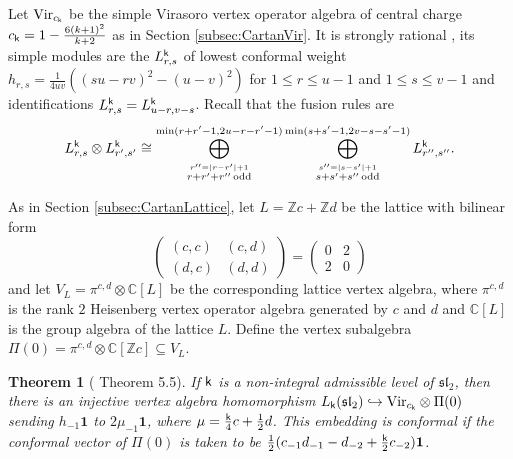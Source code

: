 \documentclass[a4paper, reqno]{amsart}
\newtheorem{theorem}{Theorem}[section]
\theoremstyle{introTheorems}
\def\CC{\mathbb{C}}
\def\ZZ{\mathbb{Z}}
\renewcommand\sl{\mathfrak{sl}}
\newcommand\Vir{\textup{Vir}}
\newcommand\vac{\mathbf{1}}
\renewcommand{\1}{\mathbbold{1}}
\begin{document}
Let $\Vir_{c_\k}$ be the simple Virasoro vertex operator algebra of central charge $c_{\mathsf{k}} =1 - \frac{6(k+1)^2}{k+2}$ 
as in Section \ref{subsec:CartanVir}. It is strongly rational \cite{W}, its simple modules are the $L^{\mathsf{k}}_{r,s}$ of lowest conformal weight $h_{r,s}=\frac{1}{4uv}((su-rv)^2-(u-v)^2)$ for $1\leq r \leq u-1$ and $1\leq s \leq v-1$ and identifications $L^{\mathsf{k}}_{r,s} = L^{\mathsf{k}}_{u-r,v-s}$. Recall that the fusion rules are
\begin{equation}\label{eqn:Vir-fus-rules}
    L^{\mathsf{k}}_{r,s} \otimes L^{\mathsf{k}}_{r',s'} \cong  \bigoplus_{\stackrel{r'' = \vert r-r'\vert+1}{r+r'+r''\,\text{odd}}}^{\min(r+r'-1,2u-r-r'-1)}\bigoplus_{\stackrel{s'' = \vert s-s'\vert+1}{s+s'+s''\,\text{odd}}}^{\min(s+s'-1,2v-s-s'-1)} L^{\mathsf{k}}_{r'',s''}.
\end{equation}

\bigskip
As in Section \ref{subsec:CartanLattice}, 
let $L = \ZZ c + \ZZ d$ be the lattice with bilinear form
$$\begin{pmatrix} (c,c) & (c,d) \\ (d,c) & (d,d)\end{pmatrix}=\begin{pmatrix}0 & 2 \\2 & 0\end{pmatrix}$$
and let $V_L=\pi^{c,d}\otimes \CC[L]$ be the corresponding lattice vertex algebra, where $\pi^{c,d}$ is the rank $2$ Heisenberg vertex operator algebra generated by $c$ and $d$ and $\CC[L]$ is the group algebra of the lattice $L$. Define the vertex subalgebra $\Pi(0) = \pi^{c,d} \otimes \CC[\ZZ c] \subseteq V_L$.
\begin{theorem}[\cite{A} Theorem 5.5]\label{thm: conformal embedding}
    If $\mathsf{k}$ is a non-integral admissible level of $\sl_2$, then there is an injective vertex algebra homomorphism $L_\k(\sl_2) \hookrightarrow \Vir_{c_\k} \otimes \Pi(0)$ sending $h_{-1}\vac$ to $2\mu_{-1}\vac$, where $\mu=\frac{\mathsf{k}}{4}c+\frac{1}{2}d$. This embedding is conformal if the conformal vector of $\Pi(0)$ is taken to be $\frac{1}{2}(c_{-1}d_{-1}-d_{-2}+\frac{\k}{2}c_{-2})\vac$.
\end{theorem}
\end{document}
